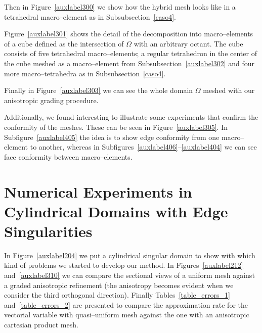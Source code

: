 Then in Figure~\ref{auxlabel300} we show how the hybrid mesh 
looks like in a tetrahedral
macro--element as in Subsubsection~\ref{caso4}. 


Figure~\ref{auxlabel301} shows the detail of the decomposition into macro--elements
of a cube defined as the intersection of $\Omega$ with an arbitrary octant. The 
cube consists of five tetrahedral macro--elements; a regular tetrahedron
in the center of the cube meshed as a macro--element from 
Subsubsection~\ref{auxlabel302} and four more macro--tetrahedra as in 
Subsubsection~\ref{caso4}.

\tauOneEnCube

Finally in Figure~\ref{auxlabel303} we can see the whole domain $\Omega$
meshed with our anisotropic grading procedure.

\tauOneEn
Additionally, we found interesting to illustrate some experiments
that confirm the conformity of the meshes. These can be seen in 
Figure~\ref{auxlabel305}. In Subfigure~\ref{auxlabel405} the idea is
to show edge conformity from one macro--element to another, whereas 
in Subfigures~\ref{auxlabel406}--\ref{auxlabel404} we can see
face conformity between macro--elements.

\conform\newpage
\section{Numerical 
Experiments in Cylindrical Domains with Edge Singularities}
\label{auxlabel215}

In Figure~\ref{auxlabel204} we put a cylindrical singular domain to show
with which kind of problems we started to develop our method.
\edgedomain
In Figures~\ref{auxlabel212} and~\ref{auxlabel310} we can
compare the sectional views of a uniform mesh against
a graded anisotropic refinement (the anisotropy becomes evident
when we consider the third orthogonal direction).
\unifSection
\gradSection
Finally Tables~\ref{table_errors_1} and~\ref{table_errors_2}
are presented to compare the approximation rate for the vectorial variable
with quasi--uniform mesh against the one with an anisotropic
cartesian product mesh.
\tableErrorsUniformCylinder 
\tableErrorsAnisoCylinder 


%
%